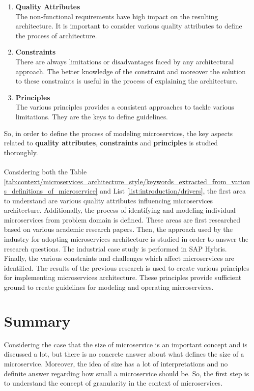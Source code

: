 \begin{enumerate}
\item \textbf{Quality Attributes}\\
The non-functional requirements have high impact on the resulting architecture. It is important to consider various quality attributes to define the process of architecture.
\item \textbf{Constraints}\\
There are always limitations or disadvantages faced by any architectural approach.  The better knowledge of the constraint and moreover the solution to these constraints is useful in the process of explaining the architecture.
\item \textbf{Principles}\\
The various principles provides a consistent approaches to tackle various limitations. They are the keys to define guidelines.
\end{enumerate}
So, in order to define the process of modeling microservices, the key aspects related to \textbf{quality attributes}, \textbf{constraints} and \textbf{principles} is studied thoroughly.
\\
\\
Considering both the Table \ref{tab:context/microservices_architecture_style/keywords_extracted_from_various_definitions_of_microservice} and List \ref{list:introduction/drivers}, the first area to understand are various quality attributes influencing microservices architecture. Additionally, the process of identifying and modeling individual microservices from problem domain is defined. These areas are first researched based on various academic research papers. Then, the approach used by the industry for adopting microservices architecture is studied in order to answer the research questions. The industrial case study is performed in SAP Hybris.
Finally, the various constraints and challenges which affect microservices are identified. 
The results of the previous research is used to create various principles for implementing microservices architecture. These principles provide sufficient ground to create guidelines for modeling and operating microservices.

\section{Summary}\label{section:context/problem_statement}
Considering the case that the size of microservice is an important concept and is discussed a lot, but there is no concrete answer about what defines the size of a microservice. Moreover, the idea of size has a lot of interpretations and no definite answer regarding how small a microservice should be. So, the first step is to understand the concept of granularity in the context of microservices.